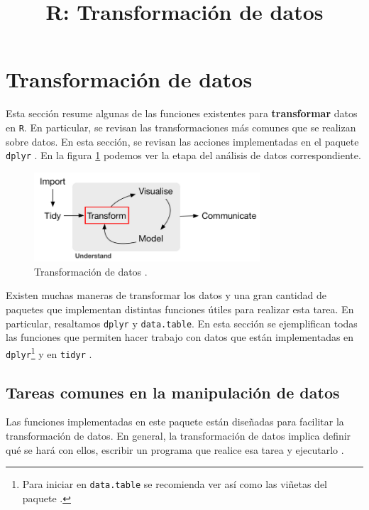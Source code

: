 \documentclass[]{article}
\title{R: Transformación de datos}
\author{}
\date{}
\let\rmarkdownfootnote\footnote%
\def\footnote{\protect\rmarkdownfootnote}
\begin{document}
\section{Transformación de datos}\label{transformacion-de-datos}

Esta sección resume algunas de las funciones existentes para
\textbf{transformar} datos en \texttt{R}. En particular, se revisan las
transformaciones más comunes que se realizan sobre datos. En esta
sección, se revisan las acciones implementadas en el paquete
\texttt{dplyr} \parencite{dplyr}. En la figura \ref{fig:ciclo3} podemos
ver la etapa del análisis de datos correspondiente.

\begin{figure}[h]
    \centering
    \includegraphics[width=0.75\textwidth]{../img/02_ciclo_3.png}
    \caption{Transformación de datos \textcite[Introducción]{grolemund2016r}.}
    \label{fig:ciclo3}
\end{figure}

Existen muchas maneras de transformar los datos y una gran cantidad de
paquetes que implementan distintas funciones útiles para realizar esta
tarea. En particular, resaltamos \texttt{dplyr} y \texttt{data.table}.
En esta sección se ejemplifican todas las funciones que permiten hacer
trabajo con datos que están implementadas en
\texttt{dplyr}\footnote{Para iniciar en \texttt{data.table} se recomienda ver \textcite{datatabletutorial} así como las viñetas del paquete \textcite{datatable}.}
y en \texttt{tidyr} \parencite{tidyr}.

\subsection{Tareas comunes en la manipulación de
datos}\label{tareas-comunes-en-la-manipulacion-de-datos}

Las funciones implementadas en este paquete están diseñadas para
facilitar la transformación de datos. En general, la transformación de
datos implica definir qué se hará con ellos, escribir un programa que
realice esa tarea y ejecutarlo
\parencite[][viñeta de introducción]{dplyr}.
\end{document}
